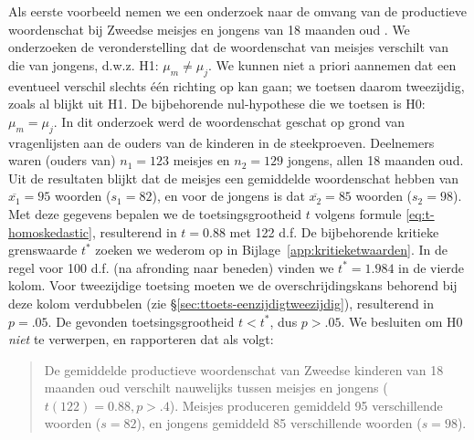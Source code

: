 \documentclass[
]{book}
\begin{document}
Als eerste voorbeeld nemen we een onderzoek naar de omvang van de
productieve woordenschat bij Zweedse meisjes en jongens van 18 maanden
oud \citep{Ande11}. We onderzoeken de veronderstelling dat de woordenschat
van meisjes verschilt van die van jongens, d.w.z. H1: \(\mu_m \ne \mu_j\).
We kunnen niet a priori aannemen dat een eventueel verschil slechts één
richting op kan gaan; we toetsen daarom tweezijdig, zoals al blijkt uit
H1. De bijbehorende nul-hypothese die we toetsen is H0: \(\mu_m = \mu_j\).
In dit onderzoek werd de woordenschat geschat op grond van vragenlijsten
aan de ouders van de kinderen in de steekproeven. Deelnemers waren
(ouders van) \(n_1=123\) meisjes en \(n_2=129\) jongens, allen 18 maanden
oud. Uit de resultaten blijkt dat de meisjes een gemiddelde woordenschat
hebben van \(\overline{x_1}=95\) woorden (\(s_1=82\)), en voor de jongens is
dat \(\overline{x_2}=85\) woorden (\(s_2=98\)). Met deze gegevens bepalen we
de toetsingsgrootheid \(t\) volgens formule
\eqref{eq:t-homoskedastic}, resulterend in \(t=0.88\) met 122 d.f. De
bijbehorende kritieke grenswaarde \(t^*\) zoeken we wederom op in
Bijlage~\ref{app:kritieketwaarden}. In de regel voor 100 d.f. (na
afronding naar beneden) vinden we \(t^*=1.984\) in de vierde kolom. Voor
tweezijdige toetsing moeten we de overschrijdingskans behorend bij deze
kolom verdubbelen (zie
§\ref{sec:ttoets-eenzijdigtweezijdig}), resulterend in \(p=.05\). De
gevonden toetsingsgrootheid \(t < t^*\), dus \(p>.05\). We besluiten om H0
\emph{niet} te verwerpen, en rapporteren dat als volgt:

\begin{quote}
De gemiddelde productieve woordenschat van Zweedse kinderen van 18
maanden oud verschilt nauwelijks tussen meisjes en jongens
(\(t(122)=0.88, p>.4\)). Meisjes produceren gemiddeld 95 verschillende
woorden (\(s=82\)), en jongens gemiddeld 85 verschillende woorden
(\(s=98\)).
\end{quote}
\end{document}
